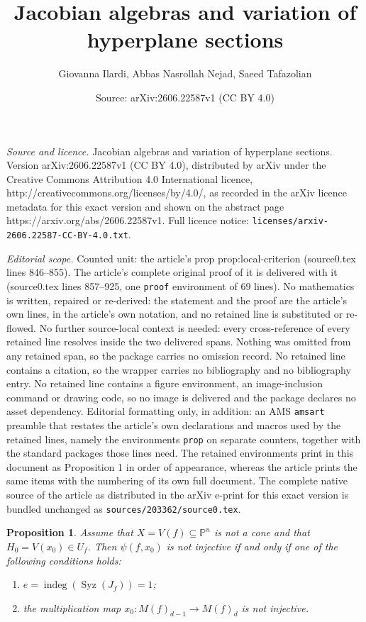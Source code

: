 \documentclass[10pt,a4paper]{amsart}
\title{Jacobian algebras and variation of hyperplane sections}
\author{Giovanna Ilardi, Abbas Nasrollah Nejad, Saeed Tafazolian}
\date{Source: arXiv:2606.22587v1 (CC BY 4.0)}
\newtheorem{prop}{Proposition}
\newcommand{\PP}{\mathbb{P}}
\begin{document}
\maketitle

\noindent\emph{Source and licence.} Jacobian algebras and variation of hyperplane sections. Version arXiv:2606.22587v1 (CC BY 4.0), distributed by arXiv under the Creative Commons Attribution 4.0 International licence, http://creativecommons.org/licenses/by/4.0/, as recorded in the arXiv licence metadata for this exact version and shown on the abstract page https://arxiv.org/abs/2606.22587v1. Full licence notice: \texttt{licenses/arxiv-2606.22587-CC-BY-4.0.txt}.\par\smallskip

\noindent\textit{Editorial scope.} Counted unit: the article's prop prop:local-criterion (source0.tex lines 846--855). The article's complete original proof of it is delivered with it (source0.tex lines 857--925, one \texttt{proof} environment of 69 lines). No mathematics is written, repaired or re-derived: the statement and the proof are the article's own lines, in the article's own notation, and no retained line is substituted or re-flowed.  No further source-local context is needed: every cross-reference of every retained line resolves inside the two delivered spans.  Nothing was omitted from any retained span, so the package carries no omission record.  No retained line contains a citation, so the wrapper carries no bibliography and no bibliography entry.  No retained line contains a figure environment, an image-inclusion command or drawing code, so no image is delivered and the package declares no asset dependency.  Editorial formatting only, in addition: an AMS \texttt{amsart} preamble that restates the article's own declarations and macros used by the retained lines, namely the environments \texttt{prop} on separate counters, together with the standard packages those lines need.  The retained environments print in this document as Proposition 1 in order of appearance, whereas the article prints the same items with the numbering of its own full document.  The complete native source of the article as distributed in the arXiv e-print for this exact version is bundled unchanged as \texttt{sources/203362/source0.tex}.
\begin{prop}
\label{prop:local-criterion}
Assume that $X=V(f)\subseteq \PP^n$ is not a cone and that $H_0=V(x_0)\in U_f$. Then
$\psi(f,x_0)$ is not injective if and only if one of the following conditions
holds:
\begin{enumerate}
\item $e=\operatorname{indeg}(\operatorname{Syz}(J_f))=1$;
\item the multiplication map $x_0:M(f)_{d-1}\to M(f)_d$ is not injective.
\end{enumerate}
\end{prop}
\end{document}
